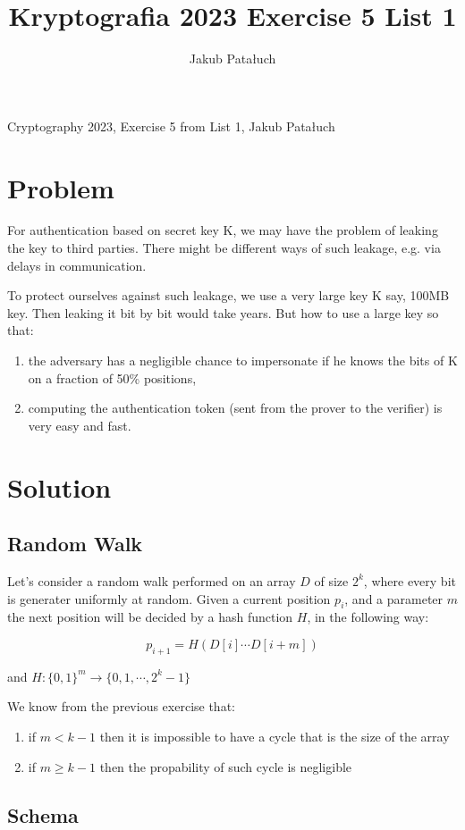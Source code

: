 \documentclass{article}
\title{Kryptografia 2023 Exercise 5 List 1}
\author{Jakub Patałuch}
\begin{document}
Cryptography 2023, Exercise 5 from List 1, Jakub Patałuch
\section{Problem}
For authentication based on secret key K, we may have the problem of leaking the key to third 
parties. There might be different ways of such leakage, e.g. via delays in communication.


To protect ourselves against such leakage, we use a very large key K say, 100MB key. Then
leaking it bit by bit would take years. But how to use a large key so that:

\begin{enumerate}
    \item the adversary has a negligible chance to impersonate if he knows the bits of K on a fraction
    of 50\% positions,
    \item computing the authentication token (sent from the prover to the verifier) is very easy and fast.
\end{enumerate}

\section{Solution}

\subsection{Random Walk}
Let's consider a random walk performed on an array $D$ of size $2^k$, where every bit
is generater uniformly at random. Given a current position $p_i$, and a parameter $m$
the next position will be decided by a hash function $H$, in the following way:

\[p_{i+1} = H(D[i] \cdots D[i+m])\]

and $H: \{0,1\}^{m} \rightarrow \{0,1,\cdots,2^k-1\}$

We know from the previous exercise that:

\begin{enumerate}
    \item if $m < k-1$ then it is impossible to have a cycle that is the size of the array
    \item if $m \ge k-1$ then the propability of such cycle is negligible
\end{enumerate}

\subsection{Schema}
\end{document}
